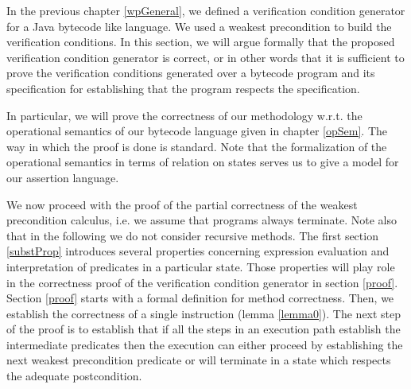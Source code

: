  In the previous chapter \ref{wpGeneral}, we defined a verification
 condition generator for a Java bytecode like language. We used a weakest precondition
 to build the verification conditions. In this section, we will argue formally that the
 proposed verification condition generator is correct, or in other words that it is sufficient
 to prove the verification conditions generated over a bytecode program and its specification 
 for establishing that the program respects the specification. 

 In particular, we will prove the correctness of our methodology w.r.t. the operational semantics of our bytecode language
 given in chapter \ref{opSem}. The way in which the proof is done is standard. Note that the formalization
 of the operational semantics in terms of relation on states serves us to give a model for our assertion
 language. 



 We now proceed with the proof of the partial correctness of the weakest precondition calculus, i.e. we assume that programs 
always terminate. Note also that in the following we do not consider recursive methods.
The first section \ref{substProp} introduces several properties concerning expression evaluation and  interpretation 
of predicates in a particular state. Those properties will play role in the correctness proof  of the verification condition generator
in section  \ref{proof}. Section \ref{proof} starts with a formal definition for method correctness. Then, we establish the correctness
of a single instruction (lemma \ref{lemma0}). The next step of the proof  is to establish that if all the steps
in an execution path establish the intermediate predicates then the execution can either proceed by establishing
the next weakest precondition predicate or will terminate in a state which respects the adequate postcondition.
  



